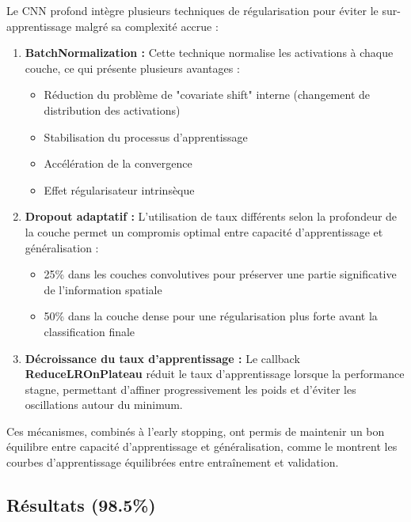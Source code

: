 \begin{flushleft}
Le CNN profond intègre plusieurs techniques de régularisation pour éviter le sur-apprentissage malgré sa complexité accrue :

\begin{enumerate}
\item \textbf{BatchNormalization : }Cette technique normalise les activations à chaque couche, ce qui présente plusieurs avantages :
\begin{itemize}
\item Réduction du problème de "covariate shift" interne (changement de distribution des activations)
\item Stabilisation du processus d'apprentissage
\item Accélération de la convergence
\item Effet régularisateur intrinsèque
\end{itemize}
\item \textbf{Dropout adaptatif :} L'utilisation de taux différents selon la profondeur de la couche permet un compromis optimal entre capacité d'apprentissage et généralisation :
\begin{itemize}
\item 25\% dans les couches convolutives pour préserver une partie significative de l'information spatiale
\item 50\% dans la couche dense pour une régularisation plus forte avant la classification finale
\end{itemize}
\item \textbf{Décroissance du taux d'apprentissage : }Le callback \textbf{ReduceLROnPlateau} réduit le taux d'apprentissage lorsque la performance stagne, permettant d'affiner progressivement les poids et d'éviter les oscillations autour du minimum.
\end{enumerate}

\bigskip

Ces mécanismes, combinés à l'early stopping, ont permis de maintenir un bon équilibre entre capacité d'apprentissage et généralisation, comme le montrent les courbes d'apprentissage équilibrées entre entraînement et validation.
\end{flushleft}

\subsection{Résultats (98.5\%)}

